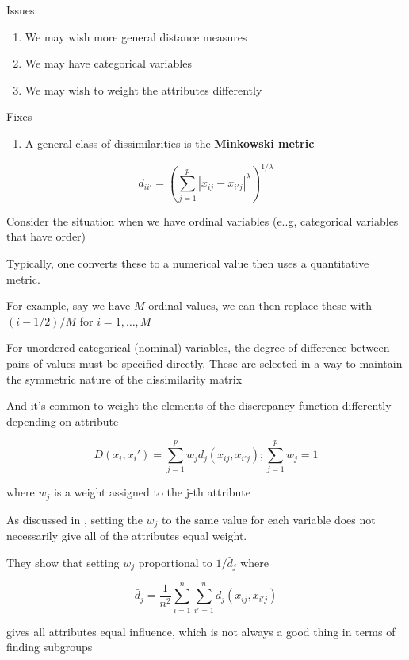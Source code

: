 \documentclass[
]{book}
\providecommand{\tightlist}{%
  \setlength{\itemsep}{0pt}\setlength{\parskip}{0pt}}
\begin{document}
Issues:

\begin{enumerate}
\def\labelenumi{\arabic{enumi}.}
\tightlist
\item
  We may wish more general distance measures
\item
  We may have categorical variables
\item
  We may wish to weight the attributes differently
\end{enumerate}

Fixes

\begin{enumerate}
\def\labelenumi{\arabic{enumi}.}
\tightlist
\item
  A general class of dissimilarities is the \textbf{Minkowski metric}
\end{enumerate}

\[
d_{ii'} = (\sum_{j=1}^p | x_{ij} - x_{i'j}|^\lambda)^{1/\lambda}
\]

Consider the situation when we have ordinal variables (e..g, categorical variables that have order)

Typically, one converts these to a numerical value then uses a quantitative metric.

For example, say we have \(M\) ordinal values, we can then replace these with \((i - 1/2)/M\) for \(i = 1, \dots, M\)

For unordered categorical (nominal) variables, the degree-of-difference between pairs of values must be specified directly. These are selected in a way to maintain the symmetric nature of the dissimilarity matrix

And it's common to weight the elements of the discrepancy function differently depending on attribute

\[
D(x_i, x_i') = \sum_{j=1}^p w_j d_j (x_{ij}, x_{i'j}); \sum_{j=1}^p w_j = 1
\]

where \(w_j\) is a weight assigned to the j-th attribute

As discussed in \citep[ 14.3.3]{hastie2001a}, setting the \(w_j\) to the same value for each variable does not necessarily give all of the attributes equal weight.

They show that setting \(w_j\) proportional to \(1/\bar{d}_j\) where

\[
\bar{d}_j = \frac{1}{n^2} \sum_{i=1}^n \sum_{i' = 1}^n d_j (x_{ij}, x_{i'j})
\]

gives all attributes equal influence, which is not always a good thing in terms of finding subgroups
\end{document}
